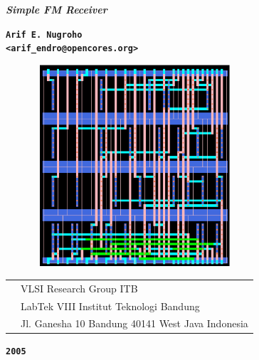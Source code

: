 \documentclass[a4paper,10pt]{article}
\begin{document}

\begin{titlepage}
\thispagestyle{empty}

\begin{center}

\Huge \textbf {\textit{Simple FM Receiver}}

\vspace{3.0cm}
\large \textbf {\texttt{Arif E. Nugroho \\<arif\_endro@opencores.org>}}

\end{center}

\vspace{3.0cm}
\begin{figure}[H]
\center
\includegraphics[width=7.5cm,height=7.5cm]{fm_cores.eps}
\end{figure}

\vspace{0.50cm}
\begin{tabular}{p{3.0cm}p{10cm}}
		& VLSI Research Group ITB\\
		& LabTek VIII Institut Teknologi Bandung\\
		& Jl. Ganesha 10 Bandung 40141 West Java Indonesia\\
\end{tabular}

\vspace{1.00cm}
\begin{center}

\Large \textbf{\texttt{2005}}

\end{center}

\end{titlepage}

\tableofcontents
\newpage
\end{document}
